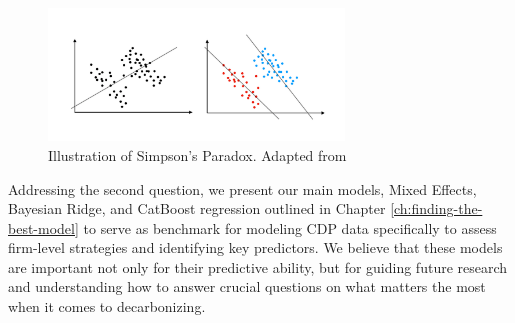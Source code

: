 \begin{figure}[H]
    \centering
    \includegraphics[width=0.7\textwidth]{thesis_tex/figures/simpson.png}
    \caption{Illustration of Simpson's Paradox. Adapted from \cite{simpsons}}
    \label{fig:simpson}
\end{figure}

Addressing the second question, we present our main models, Mixed Effects, Bayesian Ridge, and CatBoost regression outlined in Chapter \ref{ch:finding-the-best-model} to serve as benchmark for modeling CDP data specifically to assess firm-level strategies and identifying key predictors. We believe that these models are important not only for their predictive ability, but for guiding future research and understanding how to answer crucial questions on what matters the most when it comes to decarbonizing. 















